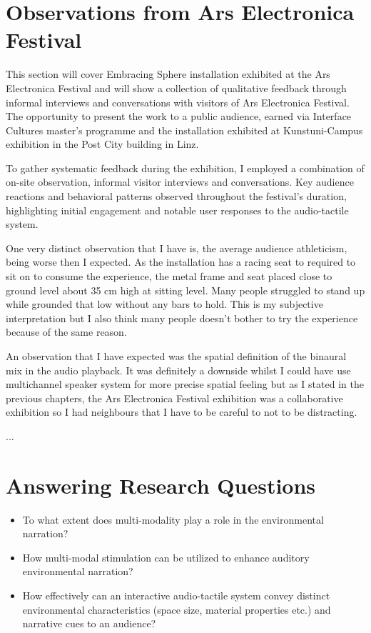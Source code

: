     \section{Observations from Ars Electronica Festival}
        This section will cover Embracing Sphere installation exhibited at the Ars Electronica Festival and will show a collection of qualitative feedback through informal interviews and conversations with visitors of Ars Electronica Festival. The opportunity to present the work to a public audience, earned via Interface Cultures master's programme and the installation exhibited at Kunstuni-Campus exhibition in the Post City building in Linz.\par

        To gather systematic feedback during the exhibition, I employed a combination of on-site observation, informal visitor interviews and conversations. Key audience reactions and behavioral patterns observed throughout the festival’s duration, highlighting initial engagement and notable user responses to the audio-tactile system.\par

        One very distinct observation that I have is, the average audience athleticism, being worse then I expected. As the installation has a racing seat to required to sit on to consume the experience, the metal frame and seat placed close to ground level about 35 cm high at sitting level. Many people struggled to stand up while grounded that low without any bars to hold. This is my subjective interpretation but I also think many people doesn't bother to try the experience because of the same reason.\par

        An observation that I have expected was the spatial definition of the binaural mix in the audio playback. It was definitely a downside whilst I could have use multichannel speaker system for more precise spatial feeling but as I stated in the previous chapters, the Ars Electronica Festival exhibition was a collaborative exhibition so I had neighbours that I have to be careful to not to be distracting.\par

        ...\par
    \section{Answering Research Questions}
        \begin{itemize}
            \item To what extent does multi-modality play a role in the environmental narration?
            \item How multi-modal stimulation can be utilized to enhance auditory environmental narration?
            \item How effectively can an interactive audio-tactile system convey distinct environmental characteristics (space size, material properties etc.) and narrative cues to an audience?
        \end{itemize}

